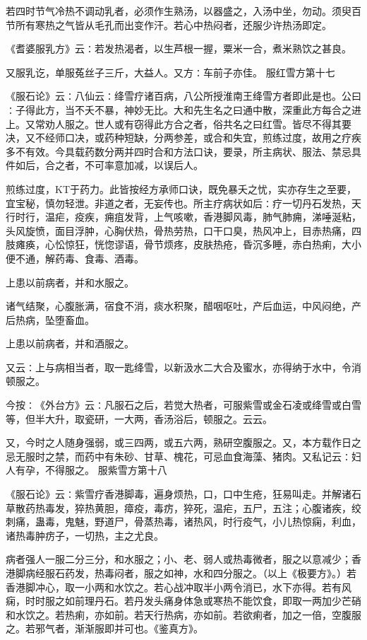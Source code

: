 \documentclass[a4paper,12pt,UTF8,twoside]{ctexbook}
\begin{document}
若四时节气冷热不调动乳者，必须作生熟汤，以器盛之，入汤中坐，勿动。须臾百节所有寒热之气皆从毛孔而出变作汗。若心中热闷者，还服少许热汤即定。

《耆婆服乳方》云∶若发热渴者，以生芦根一握，粟米一合，煮米熟饮之甚良。

又服乳讫，单服菟丝子三斤，大益人。又方∶车前子亦佳。
服红雪方第十七

《服石论》云∶八仙云∶绛雪疗诸百病，八公所授淮南王绛雪方者即此是也。公曰∶子得此方，当不夭不暴，神妙无比。大和先生名之曰通中散，深重此方每合之进上。又常劝人服之。世人或有窃得此方合之者，俗共名之曰红雪。皆尽不得其要决，又不经师口决，或药种短缺，分两参差，或合和失宜，煎练过度，故用之疗疾多不有效。今具载药数分两并四时合和方法口诀，要录，所主病状、服法、禁忌具件如后，合之者，不可率意加减，以误后人。

煎练过度，KT于药力。此皆按经方承师口诀，既免暴夭之忧，实亦存生之至要，宜宝秘，慎勿轻泄。非道之者，无妄传也。所主疗病状如后∶疗一切丹石发热，天行时行，温疟，疫疾，痈疽发背，上气咳嗽，香港脚风毒，肺气肺痈，涕唾涎粘，头风旋愤，面目浮肿，心胸伏热，骨热劳热，口干口臭，热风冲上，目赤热痛，四肢瘫痪，心忪惊狂，恍惚谬语，骨节烦疼，皮肤热疮，昏沉多睡，赤白热痢，大小便不通，解药毒、食毒、酒毒。

上患以前病者，并和水服之。

诸气结聚，心腹胀满，宿食不消，痰水积聚，醋咽呕吐，产后血运，中风闷绝，产后热病，坠堕畜血。

上患以前病者，并和酒服之。

又云∶上与病相当者，取一匙绛雪，以新汲水二大合及蜜水，亦得纳于水中，令消顿服之。

今按∶《外台方》云∶凡服石之后，若觉大热者，可服紫雪或金石凌或绛雪或白雪等，但半大升，取瓷研，一大两，香汤浴后，顿服之。云云。

又，今时之人随身强弱，或三四两，或五六两，熟研空腹服之。又，本方载作日之忌无服时之禁，而药中有朱砂、甘草、槐花，可忌血食海藻、猪肉。又私记云∶妇人有孕，不得服之。
服紫雪方第十八

《服石论》云∶紫雪疗香港脚毒，遍身烦热，口，口中生疮，狂易叫走。并解诸石草散药热毒发，猝热黄胆，瘴疫，毒疠，猝死，温疟，五尸，五注；心腹诸疾，绞刺痛，蛊毒，鬼魅，野道尸，骨蒸热毒，诸热风，时行疫气，小儿热惊痫，利血，诸热毒肿疠子，一切热，主之尤良。

病者强人一服二分三分，和水服之；小、老、弱人或热毒微者，服之以意减少；香港脚病经服石药发，热毒闷者，服之如神，水和四分服之。（以上《极要方》。）若香港脚冲心，取一小两和水饮之。若心战冲取半小两令消已，水下亦得。若有风痫，时时服之如前理丹石。若丹发头痛身体急或寒热不能饮食，即取一两加少芒硝和水饮之。若热痢，亦如前。若天行热病，亦如前。若欲痢者，加之一倍，空腹服之。若邪气者，渐渐服即并可也。《鉴真方》。
\end{document}
